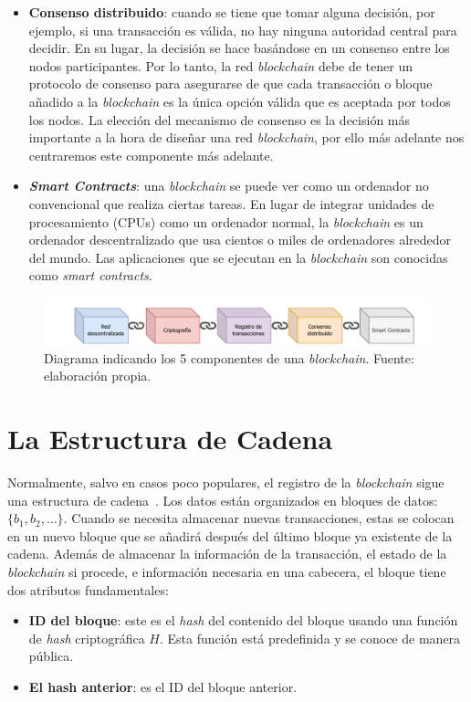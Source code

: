 \begin{itemize}
    \item \textbf{Consenso distribuido}: cuando se tiene que tomar alguna decisión, por ejemplo, si una transacción es válida, no hay ninguna autoridad central para decidir. En su lugar, la decisión se hace basándose en un consenso entre los nodos participantes. Por lo tanto, la red \textit{blockchain} debe de tener un protocolo de consenso para asegurarse de que cada transacción o bloque añadido a la \textit{blockchain} es la única opción válida que es aceptada por todos los nodos. La elección del mecanismo de consenso es la decisión más importante a la hora de diseñar una red \textit{blockchain}, por ello más adelante nos centraremos este componente más adelante.
    \item \textbf{\textit{Smart Contracts}}: una \textit{blockchain} se puede ver como un ordenador no convencional que realiza ciertas tareas. En lugar de integrar unidades de procesamiento (CPUs) como un ordenador normal, la \textit{blockchain} es un ordenador descentralizado que usa cientos o miles de ordenadores alrededor del mundo. Las aplicaciones que se ejecutan en la \textit{blockchain} son conocidas como \textit{smart contracts}.
\end{itemize}

\begin{figure}
    \centering
    \includegraphics[width=\textwidth]{figuras/blockchain diagram.pdf}
    \caption{Diagrama indicando los 5 componentes de una \textit{blockchain}. Fuente: elaboración propia.}
    \label{fig:blockchaindiag}
\end{figure}

\section{La Estructura de Cadena}
Normalmente, salvo en casos poco populares, el registro de la \textit{blockchain} sigue una estructura de cadena~\cite{survey-blockchain}. Los datos están organizados en bloques de datos: $\{b_1, b_2, \dots\}$. Cuando se necesita almacenar nuevas transacciones, estas se colocan en un nuevo bloque que se añadirá después del último bloque ya existente de la cadena. Además de almacenar la información de la transacción, el estado de la \textit{blockchain} si procede, e información necesaria en una cabecera, el bloque tiene dos atributos fundamentales:
\begin{itemize}
    \item \textbf{ID del bloque}: este es el \textit{hash} del contenido del bloque usando una función de \textit{hash} criptográfica $H$. Esta función está predefinida y se conoce de manera pública.
    \item \textbf{El hash anterior}: es el ID del bloque anterior.
\end{itemize}

